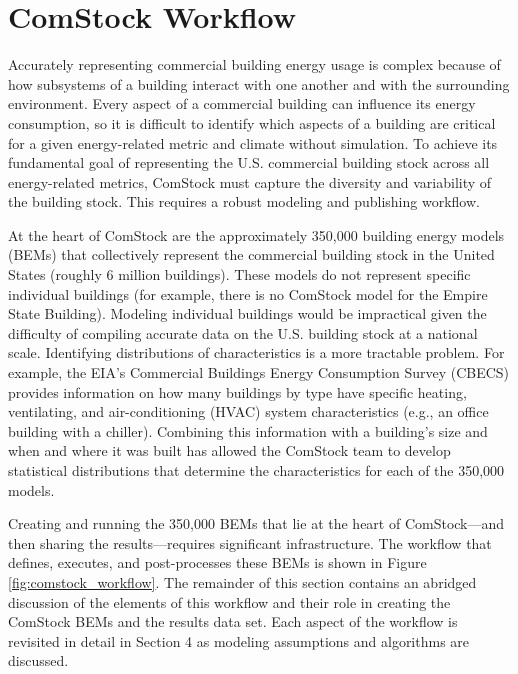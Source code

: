 \chapter{ComStock Workflow}

Accurately representing commercial building energy usage is complex because of how subsystems of a building interact with one another and with the surrounding environment. Every aspect of a commercial building can influence its energy consumption, so it is difficult to identify which aspects of a building are critical for a given energy-related metric and climate without simulation. To achieve its fundamental goal of representing the U.S. commercial building stock across all energy-related metrics, ComStock must capture the diversity and variability of the building stock. This requires a robust modeling and publishing workflow. 

At the heart of ComStock are the approximately 350,000 building energy models (BEMs) that collectively represent the commercial building stock in the United States (roughly 6 million buildings). These models do not represent specific individual buildings (for example, there is no ComStock model for the Empire State Building). Modeling individual buildings would be impractical given the difficulty of compiling accurate data on the U.S. building stock at a national scale. Identifying distributions of characteristics is a more tractable problem. For example, the EIA's Commercial Buildings Energy Consumption Survey (CBECS) \citep{eia2012cbecs} provides information on how many buildings by type have specific heating, ventilating, and air-conditioning (HVAC) system characteristics (e.g., an office building with a chiller). Combining this information with a building's size and when and where it was built has allowed the ComStock team to develop statistical distributions that determine the characteristics for each of the 350,000 models.

Creating and running the 350,000 BEMs that lie at the heart of ComStock---and then sharing the results---requires significant infrastructure. The workflow that defines, executes, and post-processes these BEMs is shown in Figure \ref{fig:comstock_workflow}. The remainder of this section contains an abridged discussion of the elements of this workflow and their role in creating the ComStock BEMs and the results data set. Each aspect of the workflow is revisited in detail in Section 4 as modeling assumptions and algorithms are discussed.

